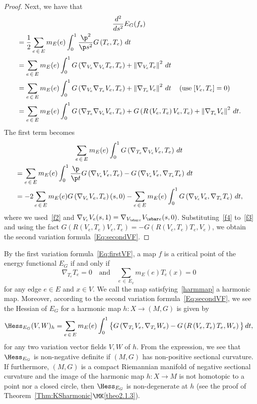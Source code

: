 \begin{proof}
Next, we have that
\begin{multline}\label{f3}
\frac{d^2}{d s^2} E_G(f_{s})\\
\begin{aligned}
&=\frac{1}{2}\sum_{e\,\in\,E}m_E(e)\int_0^1 \frac{\p^2}{\p s^2}G\left(T_e, T_e\right)\, dt\\
&=\sum_{e\,\in\,E}m_E(e)\int_0^1 G\left(\nabla_{V_e}\nabla_{V_e}T_e, T_e\right)+\left\|\nabla_{V_e}T_e\right\|^2\,dt \\
&=\sum_{e\,\in\,E}m_E(e)\int_0^1 G\left(\nabla_{V_e}\nabla_{T_e}V_e, T_e\right)+\left\|\nabla_{T_e}V_e\right\|^2\,dt \quad \left(\text{use}\; [V_e,T_e]=0\right)\\
&=\sum_{e\,\in\,E}m_E(e)\int_0^1 G\left(\nabla_{T_e}\nabla_{V_e}V_e, T_e\right)+G\left(R\left(V_e, T_e\right)V_e, T_e\right)+\left\|\nabla_{T_e}V_e\right\|^2\,dt.
\end{aligned}
\end{multline}
The first term becomes
\begin{multline}\label{f4}
\sum_{e\,\in\,E}m_E(e)\int_0^1 G\left(\nabla_{T_e}\nabla_{V_e}V_e, T_e\right)\, dt\\
\begin{aligned}
&=\sum_{e\,\in\,E}m_E(e)\int_0^1 \frac{\p}{\p t}G\left(\nabla_{V_e}V_e, T_e\right)-G\left(\nabla_{V_e}V_e, \nabla_{T_e}T_e\right)\, dt \\
&=-2\sum_{e\,\in\,E}m_E(e)G\left(\nabla_{V_e}V_e, T_e\right)(s,0)-\sum_{e\,\in\,E}m_E(e)\int_0^1G\left(\nabla_{V_e}V_e, \nabla_{T_e}T_e\right)\, dt,
\end{aligned}
\end{multline}
where we used~\eqref{f2} and $\nabla_{V_e}V_e(s,1)=\nabla_{V_{\wbar e}}V_{\wbar e}(s,0)$. Substituting~\eqref{f4} to~\eqref{f3} and using the fact $G(R(V_e, T_e)V_e, T_e)=-G(R(V_e, T_e)T_e, V_e)$, we obtain the second variation formula~\eqref{Eq:secondVF}.
\end{proof}


By the first variation formula~\eqref{Eq:firstVF}, a map $f$ is a critical point of the energy functional $E_G$ if and only if
\begin{equation}\label{harmmap}
\nabla_{T_e}T_e=0\quad \text{and}\quad \sum_{e\,\in\,E_x} m_E(e)T_e(x)=0
\end{equation}
for any edge $e\in E$ and $x\in V$. We call the map satisfying~\eqref{harmmap} a harmonic map. Moreover, according to the second variation formula~\eqref{Eq:secondVF}, we see the Hessian of $E_G$ for a harmonic map $h: X\to (M,G)$ is given by
\[
{\Hess}_{E_G}(V,W)_h=\sum_{e\,\in\,E} m_E(e)\int_0^1 \big\{G\left(\nabla_{T_e}V_e, \nabla_{T_e}W_e\right) -G\left(R\left(V_e, T_e\right)T_e, W_e\right)\big\}\,dt,
\]
for any two variation vector fields $V, W$ of $h$. From the expression, we see that ${\Hess}_{E_G}$ is non-negative definite if $(M,G)$ has non-positive sectional curvature. If furthermore, $(M,G)$ is a compact Riemannian manifold of negative sectional curvature and the image of the harmonic map $h: X\to M$ is not homotopic to a point nor a closed circle, then ${\Hess}_{E_G}$ is non-degenerate at $h$ (see the proof of Theorem~\ref{Thm:KSharmonic}$\MK$\eqref{theo2.1.3}).



